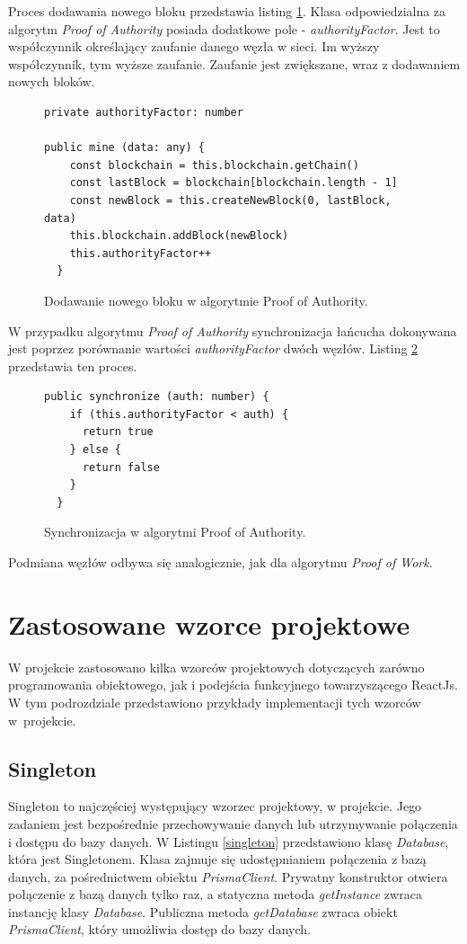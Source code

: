 \documentclass[a4paper,12pt]{book}
\begin{document}
Proces dodawania nowego bloku przedstawia listing \ref{PoABlock}. Klasa odpowiedzialna za algorytm \textit{Proof of Authority} posiada dodatkowe pole - \textit{authorityFactor}. Jest to współczynnik określający zaufanie danego węzła w sieci. Im wyższy współczynnik, tym wyższe zaufanie. Zaufanie jest zwiększane, wraz z dodawaniem nowych bloków.
 
\begin{figure}[H]  
  \centering
\begin{lstlisting}[style=ES6]
private authorityFactor: number

public mine (data: any) {
    const blockchain = this.blockchain.getChain()
    const lastBlock = blockchain[blockchain.length - 1]
    const newBlock = this.createNewBlock(0, lastBlock, data)
    this.blockchain.addBlock(newBlock)
    this.authorityFactor++
  }
\end{lstlisting}
\caption{Dodawanie nowego bloku w algorytmie Proof of Authority.}
\label{PoABlock}
\end{figure}
W przypadku algorytmu \textit{Proof of Authority} synchronizacja łańcucha dokonywana jest poprzez porównanie wartości \textit{authorityFactor} dwóch węzłów. Listing \ref{PoASync} przedstawia ten proces.

\begin{figure}[H]  
  \centering
\begin{lstlisting}[style=ES6]
public synchronize (auth: number) {
    if (this.authorityFactor < auth) {
      return true
    } else {
      return false
    }
  }
\end{lstlisting}
\caption{Synchronizacja w algorytmi Proof of Authority.}
\label{PoASync}
\end{figure}
Podmiana węzłów odbywa się analogicznie, jak dla algorytmu \textit{Proof of Work}.


\section{Zastosowane wzorce projektowe}
W projekcie zastosowano kilka wzorców projektowych dotyczących zarówno programowania obiektowego, jak i podejścia funkcyjnego towarzyszącego ReactJs. W tym podrozdziale przedstawiono przykłady implementacji tych wzorców w~projekcie.

\subsection{Singleton}
Singleton to najczęściej występujący wzorzec projektowy, w projekcie. Jego zadaniem jest bezpośrednie przechowywanie danych lub utrzymywanie połączenia i dostępu do bazy danych. W Listingu \ref{singleton} przedstawiono klasę \textit{Database}, która jest Singletonem. Klasa zajmuje się udostępnianiem połączenia z bazą danych, za pośrednictwem obiektu \textit{PrismaClient}. Prywatny konstruktor otwiera połączenie z bazą danych tylko raz, a statyczna metoda \textit{getInstance} zwraca instancję klasy \textit{Database}. Publiczna metoda \textit{getDatabase} zwraca obiekt \textit{PrismaClient}, który umożliwia dostęp do bazy danych.
\end{document}
